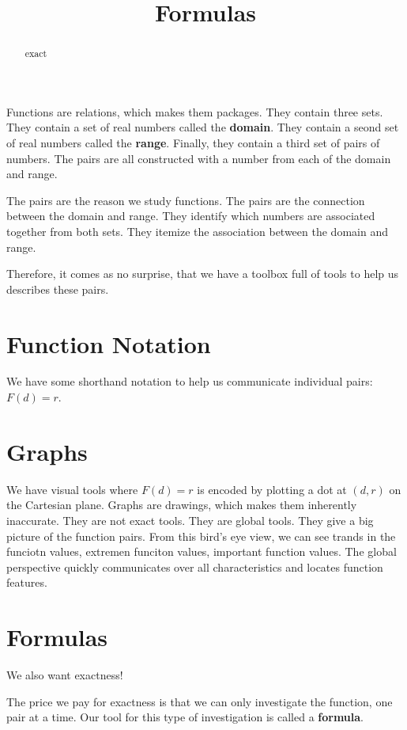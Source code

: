 \documentclass{ximera}
\title{Formulas}
\begin{document}
\begin{abstract}
exact
\end{abstract}
\maketitle


Functions are relations, which makes them packages.  They contain three sets.  They contain a set of real numbers called the \textbf{domain}.  They contain a seond set of real numbers called the \textbf{range}. Finally, they contain a third set of pairs of numbers.  The pairs are all constructed with a number from each of the domain and range.

The pairs are the reason we study functions.  The pairs are the connection between the domain and range.  They identify which numbers are associated together from both sets. They itemize the association between the domain and range.

Therefore, it comes as no surprise, that we have a toolbox full of tools to help us describes these pairs.


\section{Function Notation}

We have some shorthand notation to help us communicate individual pairs: $F(d) = r$.



\section{Graphs}

We have visual tools where $F(d) = r$ is encoded by plotting a dot at $(d, r)$ on the Cartesian plane.  Graphs are drawings, which makes them inherently inaccurate.  They are not exact tools.  They are global tools.  They give a big picture of the function pairs.  From this bird's eye view, we can see trands in the funciotn values, extremen funciton values, important function values. The global perspective quickly communicates over all characteristics and locates function features.


\section{Formulas}
We also want exactness!

The price we pay for exactness is that we can only investigate the function, one pair at a time.  Our tool for this type of investigation is called a \textbf{formula}.
\end{document}
